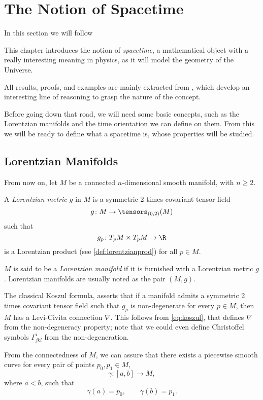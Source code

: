 \chapter{The Notion of Spacetime}

In this section we will follow \cite{romero10}

This chapter introduces the notion of \emph{spacetime}, a mathematical object with a really interesting meaning in physics, as it will model the geometry of the Universe.

All results, proofs, and examples are mainly extracted from \cite{romero10}, which develop an interesting line of reasoning to grasp the nature of the concept.

Before going down that road, we will need some basic concepts, such as the Lorentzian manifolds and the time orientation we can define on them. From this we will be ready to define what a spacetime is, whose properties will be studied.

\section{Lorentzian Manifolds}

From now on, let $M$ be a connected $n$-dimensional smooth manifold, with $n\geq2$.

\begin{definition}
	A \emph{Lorentzian metric $g$} in $M$ is a symmetric 2 times covariant tensor field
	\[
		g \colon M \to \tensors_{(0,2)}(M)
	\]
	such that
	\[
		g_p \colon T_pM \times T_pM \to \R
	\]
	is a Lorentzian product (see \autoref{def:lorentzianprod}) for all $p \in M$.
\end{definition}

\begin{definition}
	$M$ is said to be a \emph{Lorentzian manifold} if it is furnished with a Lorentzian metric $g$. Lorentzian manifolds are usually noted as the pair $(M,g)$.
\end{definition}

The classical Koszul formula, asserts that if a manifold admits a symmetric 2 times covariant tensor field such that $g_p$ is non-degenerate for every $p \in M$, then $M$ has a Levi-Civita connection $\nabla$.  This follows from \autoref{eq:koszul}, that defines $\nabla$ from the non-degeneracy property; note that we could even define Christoffel symbols $\Gamma^i_{jkl}$ from the non-degeneration.

From the connectedness of $M$, we can assure that there exists a piecewise smooth curve for every pair of points $p_0, p_1 \in M$,
\[
	\gamma \colon [a,b] \to M,
\]
where $a < b$, such that
\[
	\gamma(a) = p_0, \qquad \gamma(b) = p_1.
\]

